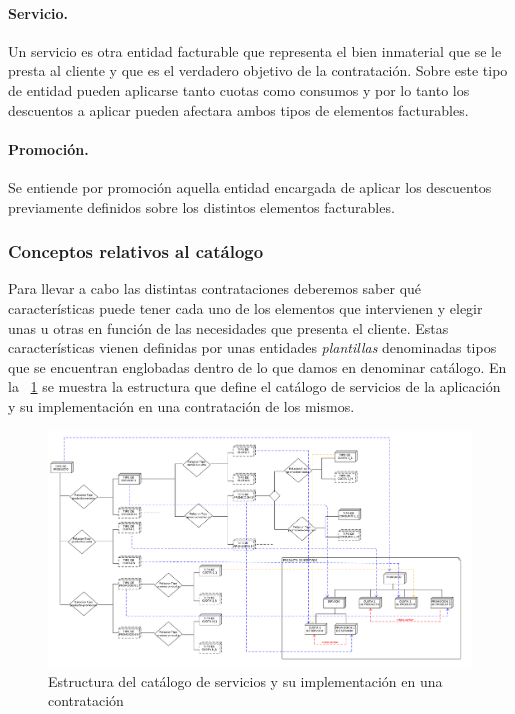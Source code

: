 \paragraph{Servicio.} Un servicio es otra entidad facturable que representa el bien inmaterial que se le presta al cliente y que es el verdadero objetivo de la contratación. Sobre este tipo de entidad pueden aplicarse tanto cuotas como consumos  y por lo tanto los descuentos a aplicar pueden afectara ambos tipos de elementos facturables.

\paragraph{Promoción.} Se entiende por promoción aquella entidad encargada de aplicar los descuentos previamente definidos sobre los distintos elementos facturables.



\subsubsection{Conceptos relativos al catálogo}
\label{sub:catálogo-conceptos}


Para llevar a cabo las distintas contrataciones deberemos saber qué características puede tener cada uno de los elementos que intervienen y elegir unas u otras en función de las necesidades que presenta el cliente. Estas características vienen definidas por unas entidades \textit{plantillas} denominadas tipos que se encuentran englobadas dentro de lo que damos en denominar catálogo. En la \figurename~\ref{fig:estructura-catalogo} se muestra la estructura que define el catálogo de servicios de la aplicación y su implementación en una contratación de los mismos.

\begin{figure}[H]
  \centering
  \includegraphics[width=\textwidth]{imaxes/estructura-catalogo.png}
  \caption{Estructura del catálogo de servicios y su implementación en una contratación}
  \label{fig:estructura-catalogo}
\end{figure}


